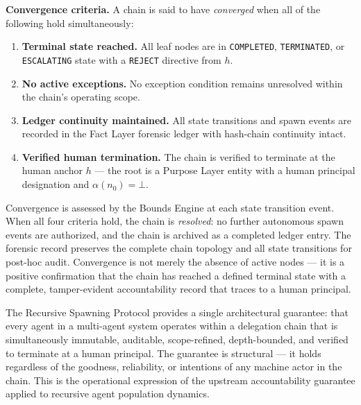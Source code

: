 \medskip
\noindent\textbf{Convergence criteria.} A chain is said to have \emph{converged} when all of the following hold simultaneously:

\begin{enumerate}
    \item[(C1)] \textbf{Terminal state reached.} All leaf nodes are in \texttt{COMPLETED}, \texttt{TERMINATED}, or \texttt{ESCALATING} state with a \texttt{REJECT} directive from $h$.
    \item[(C2)] \textbf{No active exceptions.} No exception condition remains unresolved within the chain's operating scope.
    \item[(C3)] \textbf{Ledger continuity maintained.} All state transitions and spawn events are recorded in the Fact Layer forensic ledger with hash-chain continuity intact.
    \item[(C4)] \textbf{Verified human termination.} The chain is verified to terminate at the human anchor $h$ — the root is a Purpose Layer entity with a human principal designation and $\alpha(n_0) = \bot$.
\end{enumerate}

Convergence is assessed by the Bounds Engine at each state transition event. When all four criteria hold, the chain is \emph{resolved}: no further autonomous spawn events are authorized, and the chain is archived as a completed ledger entry. The forensic record preserves the complete chain topology and all state transitions for post-hoc audit. Convergence is not merely the absence of active nodes — it is a positive confirmation that the chain has reached a defined terminal state with a complete, tamper-evident accountability record that traces to a human principal.

\medskip

The Recursive Spawning Protocol provides a single architectural guarantee: that every agent in a multi-agent system operates within a delegation chain that is simultaneously immutable, auditable, scope-refined, depth-bounded, and verified to terminate at a human principal. The guarantee is structural — it holds regardless of the goodness, reliability, or intentions of any machine actor in the chain. This is the operational expression of the upstream \bxthree{} accountability guarantee applied to recursive agent population dynamics.

